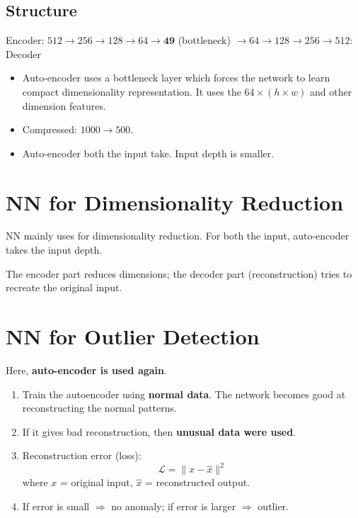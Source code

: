 \documentclass[12pt,a4paper]{article}
\begin{document}
\subsection{Structure}

Encoder: $512 \to 256 \to 128 \to 64 \to \mathbf{49}$ (bottleneck) $\to 64 \to 128 \to 256 \to 512$: Decoder

\begin{itemize}
  \item Auto-encoder uses a bottleneck layer which forces the network to learn compact dimensionality representation. It uses the $64 \times (h \times w)$ and other dimension features.
  \item Compressed: $1000 \to 500$.
  \item Auto-encoder both the input take. Input depth is smaller.
\end{itemize}

\section{NN for Dimensionality Reduction}

NN mainly uses for dimensionality reduction. For both the input, auto-encoder takes the input depth.

The encoder part reduces dimensions; the decoder part (reconstruction) tries to recreate the original input.

\section{NN for Outlier Detection}

Here, \textbf{auto-encoder is used again}.

\begin{enumerate}
  \item Train the autoencoder using \textbf{normal data}. The network becomes good at reconstructing the normal patterns.
  \item If it gives bad reconstruction, then \textbf{unusual data were used}.
  \item Reconstruction error (loss):
        \[
        \mathcal{L} = \|x - \hat{x}\|^2
        \]
        where $x$ = original input, $\hat{x}$ = reconstructed output.
  \item If error is small $\Rightarrow$ no anomaly; if error is larger $\Rightarrow$ outlier.
\end{enumerate}
\end{document}
